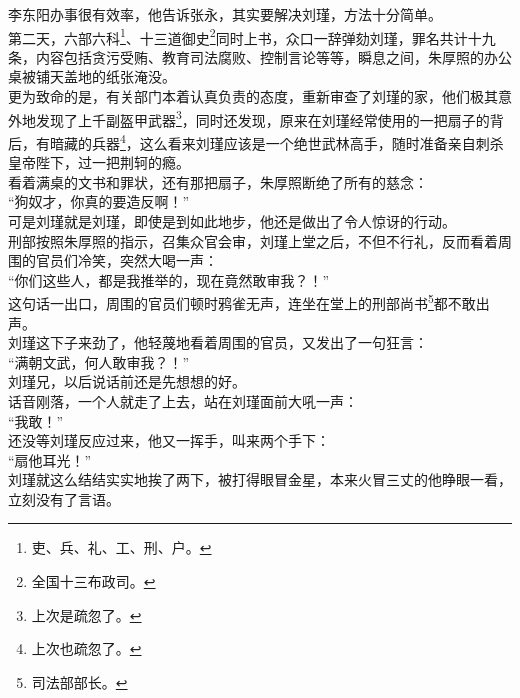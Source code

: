 \begin{multicols}{\theparacolNo}
李东阳办事很有效率，他告诉张永，其实要解决刘瑾，方法十分简单。\\

第二天，六部六科\footnote{吏、兵、礼、工、刑、户。}、十三道御史\footnote{全国十三布政司。}同时上书，众口一辞弹劾刘瑾，罪名共计十九条，内容包括贪污受贿、教育司法腐败、控制言论等等，瞬息之间，朱厚照的办公桌被铺天盖地的纸张淹没。\\

更为致命的是，有关部门本着认真负责的态度，重新审查了刘瑾的家，他们极其意外地发现了上千副盔甲武器\footnote{上次是疏忽了。}，同时还发现，原来在刘瑾经常使用的一把扇子的背后，有暗藏的兵器\footnote{上次也疏忽了。}，这么看来刘瑾应该是一个绝世武林高手，随时准备亲自刺杀皇帝陛下，过一把荆轲的瘾。\\

看着满桌的文书和罪状，还有那把扇子，朱厚照断绝了所有的慈念：\\

“狗奴才，你真的要造反啊！”\\

可是刘瑾就是刘瑾，即使是到如此地步，他还是做出了令人惊讶的行动。\\

刑部按照朱厚照的指示，召集众官会审，刘瑾上堂之后，不但不行礼，反而看着周围的官员们冷笑，突然大喝一声：\\

“你们这些人，都是我推举的，现在竟然敢审我？！”\\

这句话一出口，周围的官员们顿时鸦雀无声，连坐在堂上的刑部尚书\footnote{司法部部长。}都不敢出声。\\

刘瑾这下子来劲了，他轻蔑地看着周围的官员，又发出了一句狂言：\\

“满朝文武，何人敢审我？！”\\

刘瑾兄，以后说话前还是先想想的好。\\

话音刚落，一个人就走了上去，站在刘瑾面前大吼一声：\\

“我敢！”\\

还没等刘瑾反应过来，他又一挥手，叫来两个手下：\\

“扇他耳光！”\\

刘瑾就这么结结实实地挨了两下，被打得眼冒金星，本来火冒三丈的他睁眼一看，立刻没有了言语。\\


\end{multicols}
